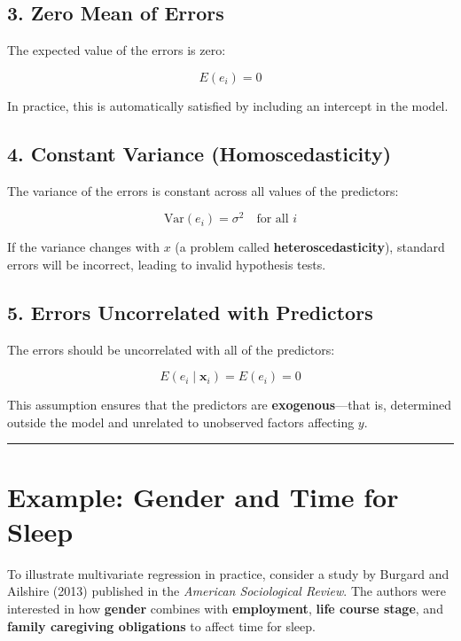 \documentclass[
  letterpaper,
  DIV=11,
  numbers=noendperiod]{scrreprt}
\begin{document}
\subsection{3. Zero Mean of Errors}\label{zero-mean-of-errors}

The expected value of the errors is zero:

\[
E(e_i) = 0
\]

In practice, this is automatically satisfied by including an intercept
in the model.

\subsection{4. Constant Variance
(Homoscedasticity)}\label{constant-variance-homoscedasticity}

The variance of the errors is constant across all values of the
predictors:

\[
\text{Var}(e_i) = \sigma^2 \quad \text{for all } i
\]

If the variance changes with \(x\) (a problem called
\textbf{heteroscedasticity}), standard errors will be incorrect, leading
to invalid hypothesis tests.

\subsection{5. Errors Uncorrelated with
Predictors}\label{errors-uncorrelated-with-predictors}

The errors should be uncorrelated with all of the predictors:

\[
E(e_i \mid \mathbf{x}_i) = E(e_i) = 0
\]

This assumption ensures that the predictors are
\textbf{exogenous}---that is, determined outside the model and unrelated
to unobserved factors affecting \(y\).

\begin{center}\rule{0.5\linewidth}{0.5pt}\end{center}

\section{Example: Gender and Time for
Sleep}\label{example-gender-and-time-for-sleep}

To illustrate multivariate regression in practice, consider a study by
Burgard and Ailshire (2013) published in the \emph{American Sociological
Review}. The authors were interested in how \textbf{gender} combines
with \textbf{employment}, \textbf{life course stage}, and \textbf{family
caregiving obligations} to affect time for sleep.
\end{document}
